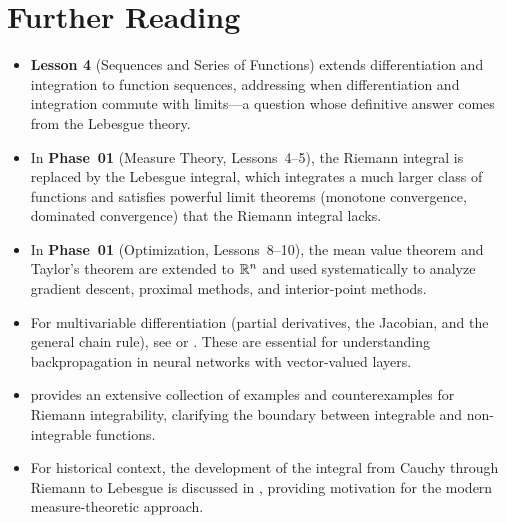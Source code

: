 \documentclass[11pt,a4paper]{article}
\begin{document}
\section{Further Reading}
\label{sec:further_reading}

\begin{itemize}
  \item \textbf{Lesson 4} (Sequences and Series of Functions) extends
    differentiation and integration to function sequences, addressing
    when differentiation and integration commute with limits---a
    question whose definitive answer comes from the Lebesgue theory.

  \item In \textbf{Phase~01} (Measure Theory, Lessons~4--5), the Riemann
    integral is replaced by the Lebesgue integral, which integrates a
    much larger class of functions and satisfies powerful limit theorems
    (monotone convergence, dominated convergence) that the Riemann
    integral lacks.

  \item In \textbf{Phase~01} (Optimization, Lessons~8--10), the mean
    value theorem and Taylor's theorem are extended to $\mathbb{R}^n$ and used
    systematically to analyze gradient descent, proximal methods, and
    interior-point methods.

  \item For multivariable differentiation (partial derivatives, the
    Jacobian, and the general chain rule), see \citet[Chapter 9]{rudin1976}
    or \citet[Chapter 5]{pugh2015}. These are essential for understanding
    backpropagation in neural networks with vector-valued layers.

  \item \citet[Chapter 6]{bartle2011} provides an extensive collection
    of examples and counterexamples for Riemann integrability, clarifying
    the boundary between integrable and non-integrable functions.

  \item For historical context, the development of the integral from
    Cauchy through Riemann to Lebesgue is discussed in
    \citet[Chapter 1]{folland1999}, providing motivation for the modern
    measure-theoretic approach.
\end{itemize}


\end{document}

